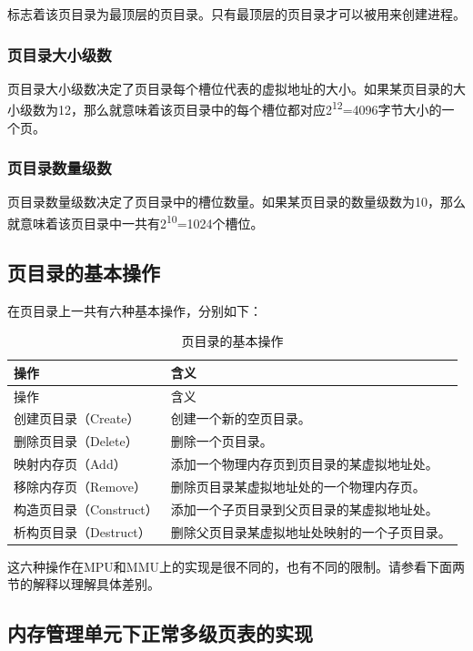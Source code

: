 标志着该页目录为最顶层的页目录。只有最顶层的页目录才可以被用来创建进程。

\subsubsection{页目录大小级数}\label{subsubsec:3-page-directory-size-order}

页目录大小级数决定了页目录每个槽位代表的虚拟地址的大小。如果某页目录的大小级数为12，那么就意味着该页目录中的每个槽位都对应2\textsuperscript{12}=4096字节大小的一个页。

\subsubsection{页目录数量级数}\label{subsubsec:3-page-directory-number-order}

页目录数量级数决定了页目录中的槽位数量。如果某页目录的数量级数为10，那么就意味着该页目录中一共有2\textsuperscript{10}=1024个槽位。

\subsection{页目录的基本操作}\label{subsec:3-basic-page-directory-operations}

在页目录上一共有六种基本操作，分别如下：

\begin{xltabular}{\textwidth}{@{}>{\hsize\raggedright\arraybackslash}X>{\hsize\raggedright\arraybackslash}X@{}}
\caption{页目录的基本操作}\label{tab:3-3-basic-page-directory-operations}\\
\toprule
操作 & 含义\tabularnewline
\endfirsthead
\toprule
操作 & 含义\tabularnewline
\midrule
\endhead
\bottomrule
\endlastfoot
创建页目录（Create） & 创建一个新的空页目录。\tabularnewline
删除页目录（Delete） & 删除一个页目录。\tabularnewline
映射内存页（Add） &
添加一个物理内存页到页目录的某虚拟地址处。\tabularnewline
移除内存页（Remove） &
删除页目录某虚拟地址处的一个物理内存页。\tabularnewline
构造页目录（Construct） &
添加一个子页目录到父页目录的某虚拟地址处。\tabularnewline
析构页目录（Destruct） &
删除父页目录某虚拟地址处映射的一个子页目录。\tabularnewline
\end{xltabular}

这六种操作在MPU和MMU上的实现是很不同的，也有不同的限制。请参看下面两节的解释以理解具体差别。

\subsection{内存管理单元下正常多级页表的实现}\label{subsec:3-normal-multilevel-page-table-under-mmu}

